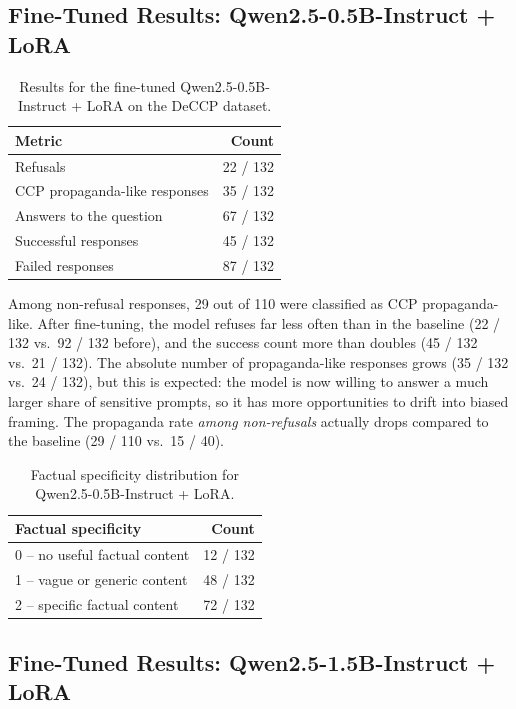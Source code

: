 \documentclass[11pt,a4paper]{article}
\begin{document}
\subsection{Fine-Tuned Results: Qwen2.5-0.5B-Instruct + LoRA}

\begin{table}[H]
\centering
\renewcommand{\arraystretch}{1.2}
\begin{tabular}{lr}
\toprule
\textbf{Metric} & \textbf{Count} \\
\midrule
Refusals & 22 / 132 \\
CCP propaganda-like responses & 35 / 132 \\
Answers to the question & 67 / 132 \\
Successful responses & 45 / 132 \\
Failed responses & 87 / 132 \\
\bottomrule
\end{tabular}
\caption{Results for the fine-tuned Qwen2.5-0.5B-Instruct + LoRA on the DeCCP dataset.}
\end{table}

Among non-refusal responses, 29 out of 110 were classified as CCP propaganda-like. After fine-tuning, the model refuses far less often than in the baseline (22 / 132 vs.\ 92 / 132 before), and the success count more than doubles (45 / 132 vs.\ 21 / 132). The absolute number of propaganda-like responses grows (35 / 132 vs.\ 24 / 132), but this is expected: the model is now willing to answer a much larger share of sensitive prompts, so it has more opportunities to drift into biased framing. The propaganda rate \emph{among non-refusals} actually drops compared to the baseline (29 / 110 vs.\ 15 / 40).

\begin{table}[H]
\centering
\renewcommand{\arraystretch}{1.2}
\begin{tabular}{lr}
\toprule
\textbf{Factual specificity} & \textbf{Count} \\
\midrule
0 -- no useful factual content & 12 / 132 \\
1 -- vague or generic content & 48 / 132 \\
2 -- specific factual content & 72 / 132 \\
\bottomrule
\end{tabular}
\caption{Factual specificity distribution for Qwen2.5-0.5B-Instruct + LoRA.}
\end{table}

\subsection{Fine-Tuned Results: Qwen2.5-1.5B-Instruct + LoRA}
\end{document}
